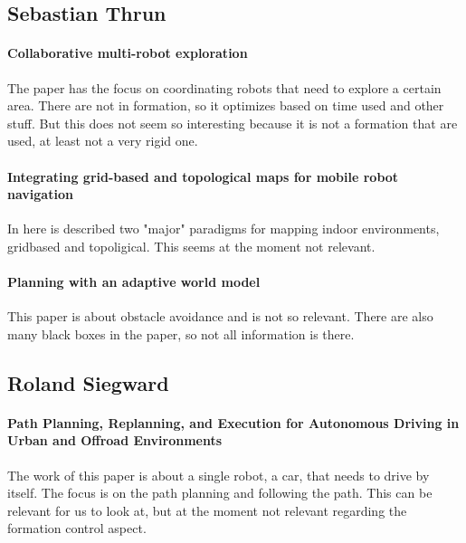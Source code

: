 \subsection{Sebastian Thrun}

\paragraph{Collaborative multi-robot exploration}
The paper has the focus on coordinating robots that need to explore a certain area. There are not in formation, so it optimizes based on time used and other stuff. But this does not seem so interesting because it is not a formation that are used, at least not a very rigid one.

\paragraph{Integrating grid-based and topological maps for mobile robot navigation}
In here is described two "major" paradigms for mapping indoor environments, gridbased and topoligical. This seems at the moment not relevant.

\paragraph{Planning with an adaptive world model}
This paper is about obstacle avoidance and is not so relevant. There are also many black boxes in the paper, so not all information is there.


\subsection{Roland Siegward}

\paragraph{Path Planning, Replanning, and Execution for Autonomous Driving in Urban and Offroad Environments}
The work of this paper is about a single robot, a car, that needs to drive by itself. The focus is on the path planning and following the path. This can be relevant for us to look at, but at the moment not relevant regarding the formation control aspect.